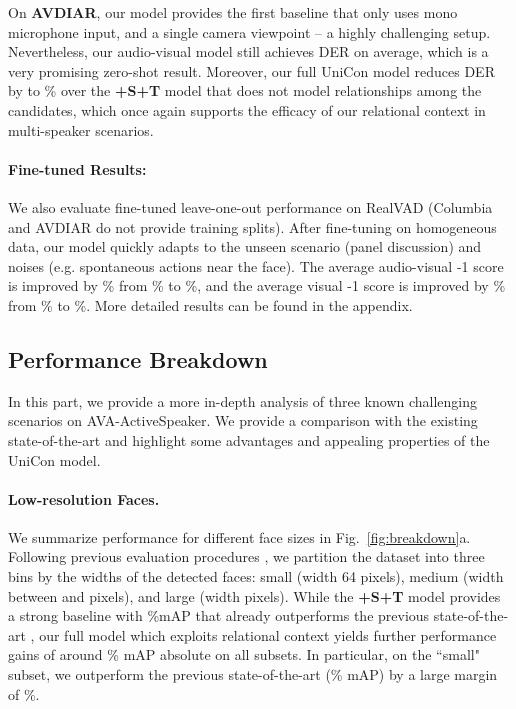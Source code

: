 \documentclass[sigconf]{acmart}
\newcommand\NetName{UniCon}
\begin{document}
\begin{CCSXML}
On \textbf{AVDIAR}, our model provides the first baseline 
that only uses mono microphone input, and a single camera viewpoint -- a highly challenging setup. Nevertheless, our audio-visual model still achieves  DER on average, which is a very promising zero-shot result. Moreover, our full \NetName{} model reduces DER by  to \% over the \textbf{+S+T} model that does not model relationships among the candidates, which once again supports the efficacy of our relational context in multi-speaker scenarios.
\vspace{-2ex}
\paragraph{Fine-tuned Results:} We also evaluate fine-tuned leave-one-out performance on RealVAD (Columbia and AVDIAR do not provide training splits). After 
fine-tuning on homogeneous data, our model quickly adapts to the unseen scenario (panel discussion) and noises (e.g. spontaneous actions near the face). The average audio-visual -1 score is improved by \% from \% to \%, and the average visual -1 score is improved by \% from \% to \%. More detailed results can be found in the appendix.
\vspace{-1.5ex}
\subsection{Performance Breakdown}
In this part, we provide a more in-depth analysis of three known challenging scenarios on AVA-ActiveSpeaker. We provide a comparison with the existing state-of-the-art and highlight some advantages and appealing properties of the \NetName{} model.
\vspace{-1ex}
\paragraph{Low-resolution Faces.} We summarize performance for different face sizes in Fig.~\ref{fig:breakdown}a. Following previous evaluation procedures \cite{DBLP:conf/icassp/RothCKMGKRSSXP20,DBLP:conf/cvpr/AlcazarCMPLAG20}, we partition the dataset into three bins by the widths of the detected faces: small (width  64 pixels), medium (width between  and  pixels), and large (width  pixels). While the \textbf{+S+T} model provides a strong baseline with \%mAP that already outperforms the previous state-of-the-art \cite{DBLP:conf/cvpr/AlcazarCMPLAG20}, our full model which exploits relational context yields further performance gains of around \% mAP absolute on all subsets. In particular, on the ``small" subset, we outperform the previous state-of-the-art (\% mAP) by a large margin of \%.


\end{CCSXML}
\end{document}
